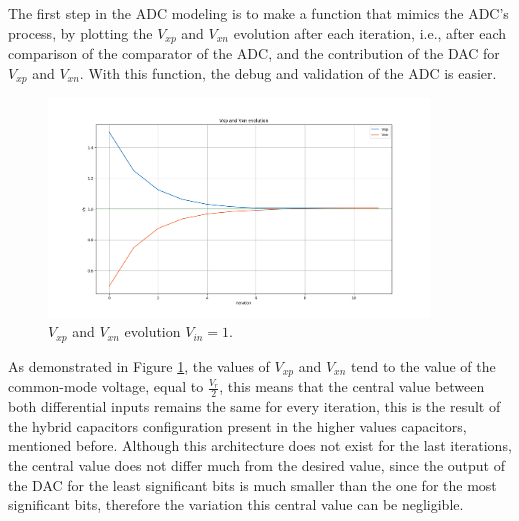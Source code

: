 The first step in the ADC modeling is to make a function that mimics the ADC's process, by plotting the $V_{xp}$ and $V_{xn}$ evolution after each iteration, i.e., after each comparison of the comparator of the ADC, and the contribution of the DAC for $V_{xp}$ and $V_{xn}$. With this function, the debug and validation of the ADC is easier.

\begin{figure}[h]

    \centering
    \includegraphics*[width=0.9\textwidth]{Images/Vxp_Vxn_evolution_1V_input.png}
    \caption{$V_{xp}$ and $V_{xn}$ evolution $V_{in} = 1$.}

    \label{fig:VxpVxnEvo}
\end{figure}

As demonstrated in Figure \ref{fig:VxpVxnEvo}, the values of $V_{xp}$ and $V_{xn}$ tend to the value of the common-mode voltage, equal to $\frac{V_r}{2}$, this means that the central value between both differential inputs remains the same for every iteration, this is the result of the hybrid capacitors configuration present in the higher values capacitors, mentioned before. Although this architecture does not exist for the last iterations, the central value does not differ much from the desired value, since the output of the DAC for the least significant bits is much smaller than the one for the most significant bits, therefore the variation this central value can be negligible.

